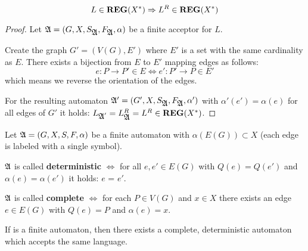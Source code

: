 \bigskip
\begin{theorem}
\[ L \in \mbox{{\bf REG}}(X^*) \Rightarrow L^R \in \mbox{{\bf REG}}(X^*) \]
\end{theorem}

\begin{proof}
Let $\mbox{$\mathfrak{A}$} = (G, X, S_{\mbox{$\mathfrak{A}$}}, F_{\mbox{$\mathfrak{A}$}}, \alpha)$ be a
finite acceptor for $L$.

Create the graph $G' = (V(G), E')$ where $E'$ is a set with the same cardinality
as $E$. There exists a bijection from $E$ to $E'$ mapping edges as follows:
\[ e : P \to P' \in E \Leftrightarrow e' : P' \to P \in E' \]
which means we reverse the orientation of the edges.

For the resulting automaton $\mbox{$\mathfrak{A'}$} = (G', X, S_{\mbox{$\mathfrak{A}$}},
F_{\mbox{$\mathfrak{A}$}}, \alpha')$ with $\alpha'(e') = \alpha(e)$ for all edges of $G'$
it holds: $L_{\mbox{$\mathfrak{A}$}'} = L_{\mbox{$\mathfrak{A}$}}^R = L^R \in \mbox{{\bf REG}}(X^*)$.
\end{proof}

\bigskip
\begin{definition}
Let $\mbox{$\mathfrak{A}$} = (G, X, S, F, \alpha)$ be a finite automaton with
$\alpha(E(G)) \subset X$ (each edge is labeled with a single
symbol).

$\mbox{$\mathfrak{A}$}$ is called {\bf deterministic} $\Leftrightarrow$ for all $e, e'
\in E(G)$ with $Q(e) = Q(e')$ and $\alpha(e) = \alpha(e')$ it holds: $e$ = $e'$.

$\mbox{$\mathfrak{A}$}$ is called {\bf complete} $\Leftrightarrow$ for each $P \in V(G)$
and $x \in X$ there exists an edge $e \in E(G)$ with $Q(e) = P$ and $\alpha(e)
= x$.
\end{definition}

\begin{theorem}
If  is a finite automaton, then there exists a complete,
deterministic automaton  which accepts the same language.
\end{theorem}

